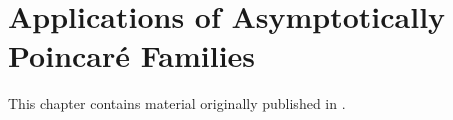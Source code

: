 \chapter{Applications of Asymptotically Poincar\'e Families}
\label{applications}

\noindent This chapter contains material originally published in \cite{quinn2020}.
 






